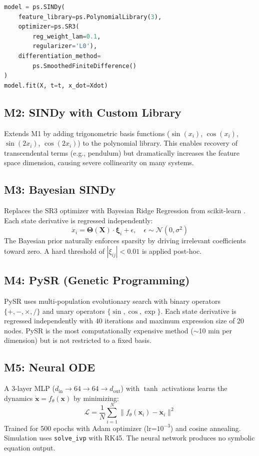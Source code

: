 \begin{lstlisting}[language=Python, caption={M1 Implementation (sindy\_poly.py)}]
model = ps.SINDy(
    feature_library=ps.PolynomialLibrary(3),
    optimizer=ps.SR3(
        reg_weight_lam=0.1, 
        regularizer='L0'),
    differentiation_method=
        ps.SmoothedFiniteDifference()
)
model.fit(X, t=t, x_dot=Xdot)
\end{lstlisting}

\subsection{M2: SINDy with Custom Library}
Extends M1 by adding trigonometric basis functions ($\sin(x_i)$, $\cos(x_i)$, $\sin(2x_i)$, $\cos(2x_i)$) to the polynomial library. This enables recovery of transcendental terms (e.g., pendulum) but dramatically increases the feature space dimension, causing severe collinearity on many systems.

\subsection{M3: Bayesian SINDy}
Replaces the SR3 optimizer with Bayesian Ridge Regression from scikit-learn \cite{tipping2001}. Each state derivative is regressed independently:
\begin{equation}
\dot{x}_i = \boldsymbol{\Theta}(\mathbf{X}) \cdot \boldsymbol{\xi}_i + \epsilon, \quad \epsilon \sim \mathcal{N}(0, \sigma^2)
\end{equation}
The Bayesian prior naturally enforces sparsity by driving irrelevant coefficients toward zero. A hard threshold of $|\xi_{ij}| < 0.01$ is applied post-hoc.

\subsection{M4: PySR (Genetic Programming)}
PySR \cite{cranmer2023} uses multi-population evolutionary search with binary operators $\{+, -, \times, /\}$ and unary operators $\{\sin, \cos, \exp\}$. Each state derivative is regressed independently with 40 iterations and maximum expression size of 20 nodes. PySR is the most computationally expensive method ($\sim$10 min per dimension) but is not restricted to a fixed basis.

\subsection{M5: Neural ODE}
A 3-layer MLP ($d_\text{in} \to 64 \to 64 \to d_\text{out}$) with $\tanh$ activations learns the dynamics $\dot{\mathbf{x}} = f_\theta(\mathbf{x})$ by minimizing:
\begin{equation}
\mathcal{L} = \frac{1}{N}\sum_{i=1}^{N} \|f_\theta(\mathbf{x}_i) - \dot{\mathbf{x}}_i\|^2
\end{equation}
Trained for 500 epochs with Adam optimizer (lr=$10^{-3}$) and cosine annealing. Simulation uses \texttt{solve\_ivp} with RK45. The neural network produces no symbolic equation output.

